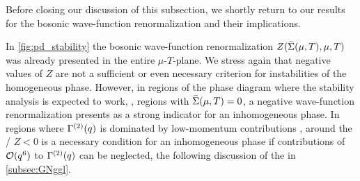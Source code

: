 Before closing our discussion of this subsection, we shortly return to our results for the bosonic wave-function renormalization and their implications.

In \cref{fig:pd_stability} the bosonic wave-function renormalization $Z ( \bar{\Sigma} ( \mu, T ), \mu, T )$ was already presented in the entire $\mu$-$T$-plane.
We stress again that negative values of $Z$ are not a sufficient or even necessary criterion for instabilities of the homogeneous phase.
However, in regions of the phase diagram where the stability analysis is expected to work, \ie{}, regions with ${\bar{\Sigma}(\mu,T)=0}$, a negative wave-function renormalization presents as a strong indicator for an inhomogeneous phase.
In regions where $\Gamma^{(2)}(q)$ is dominated by low-momentum contributions \dash{} \ie{}, around the \cp{}/\lp{} \dash{} $Z<0$ is a necessary condition for an inhomogeneous phase if contributions of ${\mathcal{O}(q^6)}$ to $\Gamma^{(2)}(q)$ can be neglected, \cf{} the following discussion of the \ggla{} in \cref{subsec:GNggl}.

